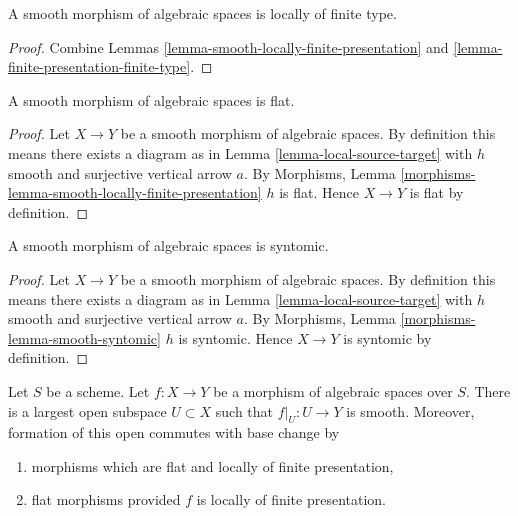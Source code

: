 \begin{lemma}
\label{lemma-smooth-locally-finite-type}
A smooth morphism of algebraic spaces is locally of finite type.
\end{lemma}

\begin{proof}
Combine
Lemmas \ref{lemma-smooth-locally-finite-presentation} and
\ref{lemma-finite-presentation-finite-type}.
\end{proof}

\begin{lemma}
\label{lemma-smooth-flat}
A smooth morphism of algebraic spaces is flat.
\end{lemma}

\begin{proof}
Let $X \to Y$ be a smooth morphism of algebraic spaces. By
definition this means there exists a diagram as in
Lemma \ref{lemma-local-source-target}
with $h$ smooth and surjective vertical arrow $a$. By
Morphisms, Lemma \ref{morphisms-lemma-smooth-locally-finite-presentation}
$h$ is flat. Hence $X \to Y$ is flat by definition.
\end{proof}

\begin{lemma}
\label{lemma-smooth-syntomic}
A smooth morphism of algebraic spaces is syntomic.
\end{lemma}

\begin{proof}
Let $X \to Y$ be a smooth morphism of algebraic spaces. By
definition this means there exists a diagram as in
Lemma \ref{lemma-local-source-target}
with $h$ smooth and surjective vertical arrow $a$. By
Morphisms, Lemma \ref{morphisms-lemma-smooth-syntomic}
$h$ is syntomic. Hence $X \to Y$ is syntomic by definition.
\end{proof}

\begin{lemma}
\label{lemma-where-smooth}
Let $S$ be a scheme. Let $f : X \to Y$ be a morphism of algebraic
spaces over $S$. There is a largest open subspace $U \subset X$
such that $f|_U : U \to Y$ is smooth. Moreover, formation of
this open commutes with base change by
\begin{enumerate}
\item morphisms which are flat and
locally of finite presentation,
\item flat morphisms provided $f$ is locally of finite presentation.
\end{enumerate}
\end{lemma}


